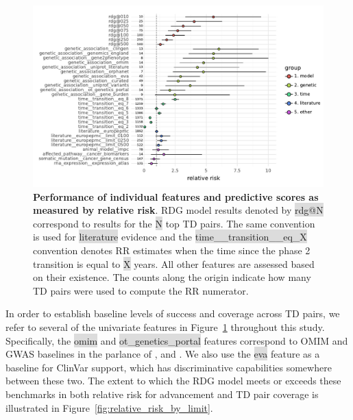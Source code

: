 \documentclass{article}
\begin{document}
\begin{figure}[!htb]
  \centering
  \captionsetup{width=.9\linewidth}
  \includegraphics[width=1\textwidth]{relative_risk_core_features.pdf}
  \caption{
    \textbf{Performance of individual features and predictive scores as measured by relative risk}.
    RDG model results denoted by \colorbox{Gainsboro}{rdg@N} correspond to results for the \colorbox{Gainsboro}{N} top TD pairs. The same convention is used for \colorbox{Gainsboro}{literature} evidence and the \colorbox{Gainsboro}{time\_\_transition\_\_eq\_X} convention denotes RR estimates when the time since the phase 2 transition is equal to \colorbox{Gainsboro}{X} years. All other features are assessed based on their existence. The counts along the origin indicate how many TD pairs were used to compute the RR numerator.
  }
  \label{fig:relative_risk_core_features}
\end{figure}

In order to establish baseline levels of success and coverage across TD pairs, we refer to several of the univariate features in Figure~\ref{fig:relative_risk_core_features} throughout this study. Specifically, the \colorbox{Gainsboro}{omim} and \colorbox{Gainsboro}{ot\_genetics\_portal} features correspond to OMIM and GWAS baselines in the parlance of \cite{King2019-rc}, \cite{Nelson2015-eg} and \cite{Minikel2023.06.23.23291765}. We also use the \colorbox{Gainsboro}{eva} feature as a baseline for ClinVar support, which has discriminative capabilities somewhere between these two. The extent to which the RDG model meets or exceeds these benchmarks in both relative risk for advancement and TD pair coverage is illustrated in Figure~\ref{fig:relative_risk_by_limit}.
\end{document}
